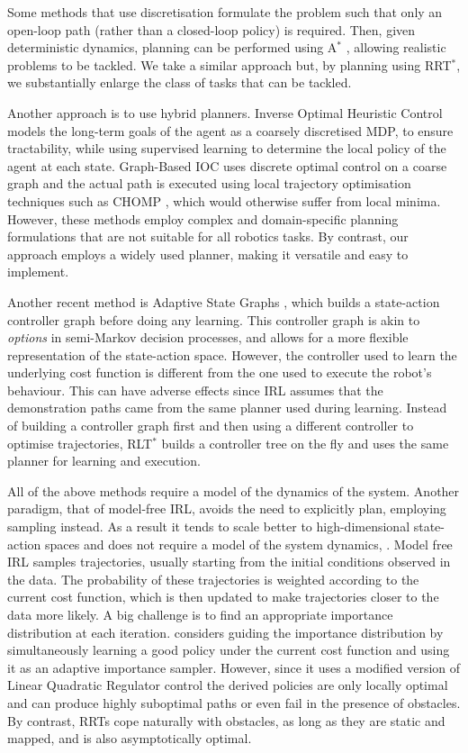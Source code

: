 \documentclass[a4paper,11pt]{report}
\begin{document}
Some methods that use discretisation formulate the problem such that only an open-loop path (rather than a closed-loop policy) is required. Then, given deterministic dynamics, planning can be performed using A$^*$ \cite{ratliff2006maximum}, allowing realistic problems to be tackled. We take a similar approach but, by planning using RRT$^*$, we substantially enlarge the class of tasks that can be tackled.

Another approach is to use hybrid planners. Inverse Optimal Heuristic Control \cite{ratliff2009inverse} models the long-term goals of the agent as a coarsely discretised MDP, to ensure tractability, while using supervised learning to determine the local policy of the agent at each state. Graph-Based IOC \cite{byravan2015graph} uses discrete optimal control on a coarse graph and the actual path is executed using local trajectory optimisation techniques such as CHOMP \cite{ratliff2009chomp}, which would otherwise suffer from local minima. However, these methods employ complex and domain-specific planning formulations that are not suitable for all robotics tasks. By contrast, our approach employs a widely used planner, making it versatile and easy to implement. 

Another recent method is Adaptive State Graphs \cite{okallearning}, which builds a state-action controller graph before doing any learning. This controller graph is akin to \emph{options} in semi-Markov decision processes, and allows for a more flexible representation of the state-action space. However, the controller used to learn the underlying cost function is different from the one used to execute the robot's behaviour. This can have adverse effects since IRL  assumes that the demonstration paths came from the same planner used during learning.  Instead of building a controller graph first and then using a different controller to optimise trajectories, RLT$^*$ builds a controller tree on the fly and uses the same planner for learning and execution.

All of the above methods require a model of the dynamics of the system. Another paradigm, that of model-free IRL, avoids the need to explicitly plan, employing sampling instead. As a result it tends to scale better to high-dimensional state-action spaces and does not require a model of the system dynamics, \cite{boularias2011relative,kalakrishnan2013learning}.
 Model free IRL samples trajectories, usually starting from the initial conditions observed in the data. The probability of these trajectories is weighted according to the current cost function, which is then updated to make trajectories closer to the data more likely. A big challenge is to find an appropriate importance distribution at each iteration. \cite{finn2016guided} considers guiding the importance distribution by simultaneously learning a good policy under the current cost function and using it as an adaptive importance sampler. However, since it uses a modified version of Linear Quadratic Regulator control the derived policies are only locally optimal and can produce highly suboptimal paths or even fail in the presence of obstacles. By contrast, RRTs cope naturally with obstacles, as long as they are static and mapped, and is also asymptotically optimal.
\end{document}

